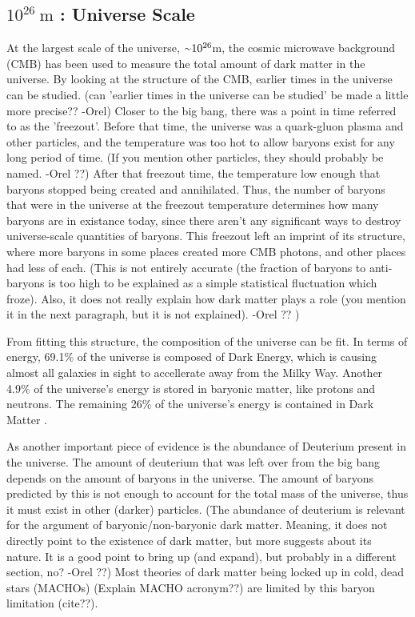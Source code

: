   \subsection{$10^{26}\:\text{m}$ : Universe Scale}
    At the largest scale of the universe, $\nicetilde 10^{26}$m, the cosmic microwave background (CMB) has been used to measure the total amount of dark matter in the universe.
    By looking at the structure of the CMB, earlier times in the universe can be studied.
    {\color{red}(can 'earlier times in the universe can be studied' be made a little more precise?? -Orel)}
    Closer to the big bang, there was a point in time referred to as the 'freezout'.
    Before that time, the universe was a quark-gluon plasma and other particles, and the temperature was too hot to allow baryons exist for any long period of time.
    {\color{red}(If you mention other particles, they should probably be named. -Orel ??)}
    After that freezout time, the temperature low enough that baryons stopped being created and annihilated.
    Thus, the number of baryons that were in the universe at the freezout temperature determines how many baryons are in existance today, since there aren't any significant ways to destroy universe-scale quantities of baryons.
    This freezout left an imprint of its structure, where more baryons in some places created more CMB photons, and other places had less of each.
    {\color{red}(This is not entirely accurate (the fraction of baryons to anti-baryons is too high to be explained as a simple statistical fluctuation which froze).
Also, it does not really explain how dark matter plays a role (you mention it in the next paragraph, but it is not explained). -Orel ?? )}

    From fitting this structure, the composition of the universe can be fit.
    In terms of energy, 69.1\% of the universe is composed of Dark Energy, which is causing almost all galaxies in sight to accellerate away from the Milky Way.
    Another 4.9\% of the universe's energy is stored in baryonic matter, like protons and neutrons.
    The remaining 26\% of the universe's energy is contained in Dark Matter \cite{planck2015}.

    As another important piece of evidence is the abundance of Deuterium present in the universe.
    The amount of deuterium that was left over from the big bang depends on the amount of baryons in the universe.
    The amount of baryons predicted by this is not enough to account for the total mass of the universe, thus it must exist in other (darker) particles.
    {\color{red}(The abundance of deuterium is relevant for the argument of baryonic/non-baryonic dark matter. Meaning, it does not directly point to the existence of dark matter, but more suggests about its nature. It is a good point to bring up (and expand), but probably in a different section, no? -Orel ??)}
    Most theories of dark matter being locked up in cold, dead stars (MACHOs) {\color{red}(Explain MACHO acronym??)} are limited by this baryon limitation {\color{red}(cite??)}.

